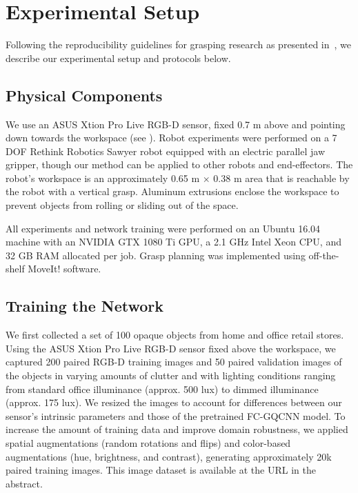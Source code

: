 \section{Experimental Setup}
\label{sec:exp_setup}

Following the reproducibility guidelines for grasping research as presented in~\cite{mahler2018guest}, we describe our experimental setup and protocols below.

\subsection{Physical Components}

We use an ASUS Xtion Pro Live RGB-D sensor, fixed 0.7 m above and pointing down towards the workspace (see ).
Robot experiments were performed on a 7 DOF Rethink Robotics Sawyer robot equipped with an electric parallel jaw gripper, though our method can be applied to other robots and end-effectors.
The robot's workspace is an approximately 0.65 m $\times$ 0.38 m area that is reachable by the robot with a vertical grasp. 
Aluminum extrusions enclose the workspace to prevent objects from rolling or sliding out of the space.  

All experiments and network training were performed on an Ubuntu 16.04 machine with an NVIDIA GTX 1080 Ti GPU, a 2.1 GHz Intel Xeon CPU, and 32 GB RAM allocated per job. Grasp planning was implemented using off-the-shelf MoveIt! software.

\subsection{Training the Network}

We first collected a set of 100 opaque objects from home and office retail stores.
Using the ASUS Xtion Pro Live RGB-D sensor fixed above the workspace, we captured 200 paired RGB-D training images and 50 paired validation images of the objects in varying amounts of clutter and with lighting conditions ranging from standard office illuminance (approx. 500 lux) to dimmed illuminance (approx. 175 lux).
We resized the images to account for differences between our sensor's intrinsic parameters and those of the pretrained FC-GQCNN model.
To increase the amount of training data and improve domain robustness, we applied spatial augmentations (\eg random rotations and flips) and color-based augmentations (\eg hue, brightness, and contrast), generating approximately 20k paired training images.
This image dataset is available at the URL in the abstract.

